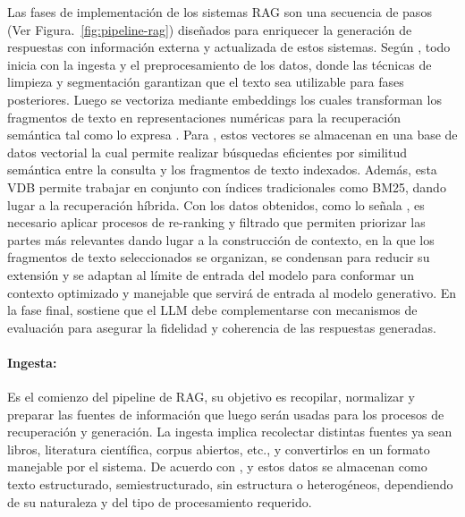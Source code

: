 Las fases de implementación de los sistemas RAG son una secuencia de pasos (Ver Figura.~\ref{fig:pipeline-rag}) diseñados para enriquecer la generación de respuestas con
información externa y actualizada de estos sistemas. 
Según \textcite{tabassum2020}, todo inicia con la ingesta y el preprocesamiento de los datos, donde las técnicas de limpieza y segmentación garantizan 
que el texto sea utilizable para fases posteriores. Luego se vectoriza mediante embeddings los cuales transforman los fragmentos de texto
en representaciones numéricas para la recuperación semántica tal como lo expresa \textcite{minaee2021}. Para \textcite{hu2024ragrau}, estos vectores se almacenan en una base de datos vectorial 
la cual permite realizar búsquedas eficientes por similitud semántica entre la consulta y los fragmentos de texto indexados.
Además, esta VDB permite trabajar en conjunto con índices tradicionales como BM25, dando lugar a la recuperación híbrida.
Con los datos obtenidos, como lo señala \textcite{sarthi2024raptor}, 
es necesario aplicar procesos de re-ranking y filtrado que permiten priorizar las partes más relevantes dando lugar a la construcción de contexto, en la que los fragmentos de texto seleccionados 
se organizan, se condensan para reducir su extensión y se adaptan al límite de entrada del modelo para conformar un contexto optimizado y manejable que servirá de entrada
al modelo generativo. En la fase final, \textcite{knollmeyer2024benchmarking} sostiene que el LLM debe complementarse con mecanismos de evaluación para asegurar la 
fidelidad y coherencia de las respuestas generadas.

\paragraph{Ingesta:} Es el comienzo del pipeline de RAG, su objetivo es recopilar, normalizar y preparar las fuentes de información
que luego serán usadas para los procesos de recuperación y generación. La ingesta implica recolectar distintas fuentes ya sean libros, literatura científica, corpus abiertos, etc., y convertirlos en un formato manejable por el 
sistema. De acuerdo con \textcite{gao2023rag}, \textcite{ibrihich2022review} y \textcite{jing2024vecdb} estos datos se almacenan como texto estructurado, semiestructurado, sin estructura o heterogéneos, dependiendo de su naturaleza y del tipo de procesamiento requerido.

